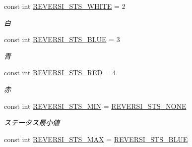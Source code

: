 \begin{DoxyCompactItemize}
\mbox{\label{class_reversi4color_wpf_1_1_reversi_const_ab6f23dc8aea7b0d9a3cc542cfb814129}} 
const int \hyperlink{class_reversi4color_wpf_1_1_reversi_const_ab6f23dc8aea7b0d9a3cc542cfb814129}{R\+E\+V\+E\+R\+S\+I\+\_\+\+S\+T\+S\+\_\+\+W\+H\+I\+TE} = 2
\begin{DoxyCompactList}\small\item\em 白 \end{DoxyCompactList}\item 
\mbox{\label{class_reversi4color_wpf_1_1_reversi_const_a024ba59e7746d771e826dde7a58fa8d1}} 
const int \hyperlink{class_reversi4color_wpf_1_1_reversi_const_a024ba59e7746d771e826dde7a58fa8d1}{R\+E\+V\+E\+R\+S\+I\+\_\+\+S\+T\+S\+\_\+\+B\+L\+UE} = 3
\begin{DoxyCompactList}\small\item\em 青 \end{DoxyCompactList}\item 
\mbox{\label{class_reversi4color_wpf_1_1_reversi_const_a70da7642cc8f3939de3d9af84358d1a2}} 
const int \hyperlink{class_reversi4color_wpf_1_1_reversi_const_a70da7642cc8f3939de3d9af84358d1a2}{R\+E\+V\+E\+R\+S\+I\+\_\+\+S\+T\+S\+\_\+\+R\+ED} = 4
\begin{DoxyCompactList}\small\item\em 赤 \end{DoxyCompactList}\item 
\mbox{\label{class_reversi4color_wpf_1_1_reversi_const_a9fe2d5a078ab4dd43d2b427f9786ea10}} 
const int \hyperlink{class_reversi4color_wpf_1_1_reversi_const_a9fe2d5a078ab4dd43d2b427f9786ea10}{R\+E\+V\+E\+R\+S\+I\+\_\+\+S\+T\+S\+\_\+\+M\+IN} = \hyperlink{class_reversi4color_wpf_1_1_reversi_const_a4de827ef80e8015214124722ddb5a325}{R\+E\+V\+E\+R\+S\+I\+\_\+\+S\+T\+S\+\_\+\+N\+O\+NE}
\begin{DoxyCompactList}\small\item\em ステータス最小値 \end{DoxyCompactList}\item 
\mbox{\label{class_reversi4color_wpf_1_1_reversi_const_a592a6b4580533423043ec11a3d26f841}} 
const int \hyperlink{class_reversi4color_wpf_1_1_reversi_const_a592a6b4580533423043ec11a3d26f841}{R\+E\+V\+E\+R\+S\+I\+\_\+\+S\+T\+S\+\_\+\+M\+AX} = \hyperlink{class_reversi4color_wpf_1_1_reversi_const_a024ba59e7746d771e826dde7a58fa8d1}{R\+E\+V\+E\+R\+S\+I\+\_\+\+S\+T\+S\+\_\+\+B\+L\+UE}

\end{DoxyCompactItemize}
